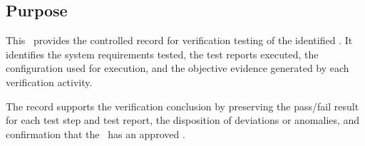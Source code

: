 \subsection{Purpose}
This \stdRptPkg\ provides the controlled record for verification testing of the
identified \stdCfgItem.  It identifies the system requirements tested, the test
reports executed, the configuration used for execution, and the objective
evidence generated by each verification activity.

\tlcVspace

The record supports the verification conclusion by preserving the pass/fail
result for each test step and test report, the disposition of deviations or
anomalies, and confirmation that the \stdCfgItem\ has an approved \stdCfgID.
